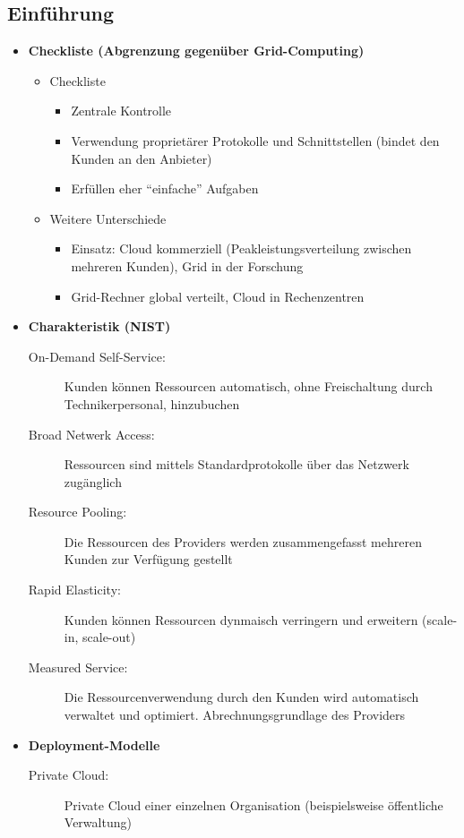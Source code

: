 \subsection{Einführung}
\begin{itemize}
	\item \textbf{Checkliste (Abgrenzung gegenüber Grid-Computing)}
	\begin{itemize}
		\item Checkliste
		\begin{itemize}
			\item Zentrale Kontrolle
			\item Verwendung proprietärer Protokolle und Schnittstellen (bindet den Kunden an den Anbieter)
			\item Erfüllen eher "`einfache"' Aufgaben
		\end{itemize}
		\item Weitere Unterschiede
		\begin{itemize}
			\item Einsatz: Cloud kommerziell (Peakleistungsverteilung zwischen mehreren Kunden), Grid in der Forschung
			\item Grid-Rechner global verteilt, Cloud in Rechenzentren
		\end{itemize}
	\end{itemize}
	\item \textbf{Charakteristik (NIST)}
	\begin{description}
		\item[On-Demand Self-Service:] Kunden können Ressourcen automatisch, ohne Freischaltung durch Technikerpersonal, hinzubuchen
		\item[Broad Netwerk Access:] Ressourcen sind mittels Standardprotokolle über das Netzwerk zugänglich
		\item[Resource Pooling:] Die Ressourcen des Providers werden zusammengefasst mehreren Kunden zur Verfügung gestellt
		\item[Rapid Elasticity:] Kunden können Ressourcen dynmaisch verringern und erweitern (scale-in, scale-out)
		\item[Measured Service:] Die Ressourcenverwendung durch den Kunden wird automatisch verwaltet und optimiert. Abrechnungsgrundlage des Providers
	\end{description}
	\item \textbf{Deployment-Modelle}
	\begin{description}
		\item[Private Cloud:] Private Cloud einer einzelnen Organisation (beispielsweise öffentliche Verwaltung)

\end{description}
\end{itemize}
